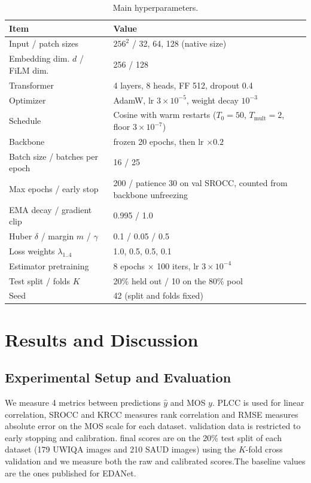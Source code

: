 \documentclass[conference]{IEEEtran}
\begin{document}
\begin{table}[H]
\centering
\caption{Main hyperparameters.}
\label{tab:hparams}
\footnotesize
\setlength{\tabcolsep}{3pt}
\begin{tabular}{p{}p{}}
\toprule
Item & Value \\
\midrule
Input / patch sizes & $256^2$ / 32, 64, 128 (native size) \\
Embedding dim. $d$ / FiLM dim. & 256 / 128 \\
Transformer & 4 layers, 8 heads, FF 512, dropout 0.4 \\
Optimizer & AdamW, lr $3\!\times\!10^{-5}$, weight decay $10^{-3}$ \\
Schedule & Cosine with warm restarts ($T_0{=}50$, $T_{\text{mult}}{=}2$, floor $3\!\times\!10^{-7}$) \\
Backbone & frozen 20 epochs, then lr $\times0.2$ \\
Batch size / batches per epoch & 16 / 25 \\
Max epochs / early stop & 200 / patience 30 on val SROCC, counted from backbone unfreezing \\
EMA decay / gradient clip & 0.995 / 1.0 \\
Huber $\delta$ / margin $m$ / $\gamma$ & 0.1 / 0.05 / 0.5 \\
Loss weights $\lambda_{1..4}$ & 1.0, 0.5, 0.5, 0.1 \\
Estimator pretraining & 8 epochs $\times$ 100 iters, lr $3\!\times\!10^{-4}$ \\
Test split / folds $K$ & 20\% held out / 10 on the 80\% pool \\
Seed & 42 (split and folds fixed) \\
\bottomrule
\end{tabular}
\end{table}

\section{Results and Discussion}
\vspace{0.3cm}
\subsection{Experimental Setup and Evaluation}

We measure 4 metrics between predictions $\hat{y}$ and MOS $y$. PLCC is used for linear correlation, SROCC and KRCC measures rank correlation and RMSE measures absolute error on the MOS scale for  each dataset. validation data is restricted to early stopping and calibration. final scores are on the  20\% test split of each dataset (179 UWIQA images and 210 SAUD images) using the $K$-fold cross validation and we measure both the raw and calibrated scores.The baseline values are the ones published for EDANet.
\vspace{0.3cm}
\end{document}
